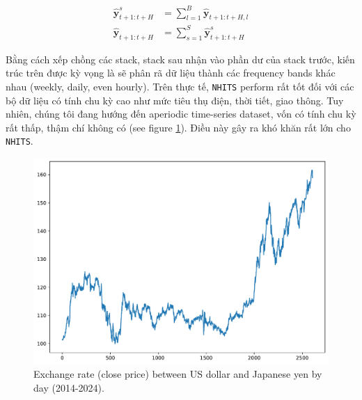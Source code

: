 \documentclass[aps,prb,groupedaddress,twocolumn,showpacs,dvipdfmx,superscriptaddress,pdftex]{revtex4-2}
\begin{document}
\begin{align}
    \mathbf{\hat{y}}_{t+1:t+H}^s &= \sum_{l=1}^{B}{\mathbf{\hat{y}}_{t+1:t+H, l}} \label{eq:sum_block}\\
    \mathbf{\hat{y}}_{t+1:t+H} &= \sum_{s=1}^{S}{\mathbf{\hat{y}}_{t+1:t+H}^s} \label{eq:sum_stack}
\end{align}

Bằng cách xếp chồng các stack, stack sau nhận vào phần dư của stack trước, kiến trúc trên được kỳ vọng là sẽ phân rã dữ liệu thành các frequency bands khác nhau (weekly, daily, even hourly). Trên thực tế, \verb|NHITS| perform rất tốt đối với các bộ dữ liệu có tính chu kỳ cao như mức tiêu thụ điện, thời tiết, giao thông. Tuy nhiên, chúng tôi đang hướng đến aperiodic time-series dataset, vốn có tính chu kỳ rất thấp, thậm chí không có (see figure \ref{fig:fx}). Điều này gây ra khó khăn rất lớn cho \verb|NHITS|.


\begin{figure}[h]
    \centering
    \includegraphics[width=\linewidth]{img/USD_JPY.pdf}
    \caption{Exchange rate (close price) between US dollar and Japanese yen by day (2014-2024).}
    \label{fig:fx}
\end{figure}
\end{document}
